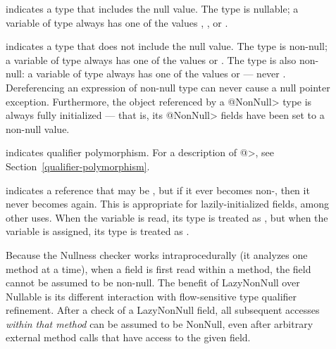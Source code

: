 \begin{description}

\item[]
  indicates a type that includes the null value.  The type 
  is nullable; a variable of type  always has one of the
  values , , or .

\item[]
  indicates a type that does not include the null value.  The type
   is non-null; a variable of type  always has
  one of the values  or .  The type  is also non-null:  a variable of type 
  always has one of the values  or  --- never
  .  Dereferencing an expression of non-null type can never cause
  a null pointer exception.
  Furthermore, the object referenced by a \<@NonNull> type is always fully
  initialized --- that is, its \<@NonNull> fields have been set to a
  non-null value.

\item[]
  indicates qualifier polymorphism.  For a description of
  \<@>, see
  Section~\ref{qualifier-polymorphism}.

\item[]
  indicates a reference that may be , but if it ever becomes
  non-, then it never becomes  again.  This is
  appropriate for lazily-initialized fields, among other uses.  When the
  variable is read, its type is treated as
  , but when the variable is
  assigned, its type is treated as
  .

  Because the Nullness checker works intraprocedurally (it analyzes one
  method at a time), when a  field is first read within a
  method, the field cannot be assumed to be non-null.  The benefit of
  LazyNonNull over Nullable is its different interaction with
  flow-sensitive type qualifier refinement.  After a check of a LazyNonNull
  field, all subsequent accesses \emph{within that method} can be assumed
  to be NonNull, even after arbitrary external method calls that have
  access to the given field.

\end{description}

